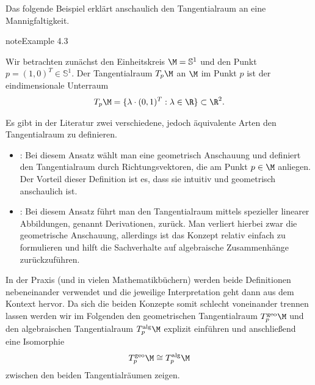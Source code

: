 \documentclass[letterpaper,10pt,english]{jupyterBook}
\begin{document}
\sphinxAtStartPar
Das folgende Beispiel erklärt anschaulich den Tangentialraum an eine Mannigfaltigkeit.
\label{manifolds/tangential:example-0}
\begin{sphinxadmonition}{note}{Example 4.3}



\sphinxAtStartPar
Wir betrachten zunächst den Einheitskreis \(\M = \mathbb{S}^1\) und den Punkt \(p = (1, 0)^T \in \mathbb{S}^1\).
Der Tangentialraum \(T_p\M\) an \(\M\) im Punkt \(p\) ist der eindimensionale Unterraum
\begin{equation*}
\begin{split}T_p\M = \lbrace \lambda \cdot (0, 1)^T : \lambda \in \R \rbrace \subset \R^2.\end{split}
\end{equation*}\end{sphinxadmonition}

\sphinxAtStartPar
Es gibt in der Literatur zwei verschiedene, jedoch äquivalente Arten den Tangentialraum zu definieren.
\begin{itemize}
\item {} 
\sphinxAtStartPar
{}: Bei diesem Ansatz wählt man eine geometrisch Anschauung und definiert den Tangentialraum durch Richtungsvektoren, die am Punkt \(p\in\M\) anliegen.
Der Vorteil dieser Definition ist es, dass sie intuitiv und geometrisch anschaulich ist.

\item {} 
\sphinxAtStartPar
{}: Bei diesem Ansatz führt man den Tangentialraum mittels spezieller linearer Abbildungen, genannt Derivationen, zurück.
Man verliert hierbei zwar die geometrische Anschauung, allerdings ist das Konzept relativ einfach zu formulieren und hilft die Sachverhalte auf algebraische Zusammenhänge zurückzuführen.

\end{itemize}

\sphinxAtStartPar
In der Praxis (und in vielen Mathematikbüchern) werden beide Definitionen nebeneinander verwendet und die jeweilige Interpretation geht dann aus dem Kontext hervor.
Da sich die beiden Konzepte somit schlecht voneinander trennen lassen werden wir im Folgenden den geometrischen Tangentialraum \(T^{\text{geo}}_p\M\) und den algebraischen Tangentialraum \(T^{\text{alg}}_p\M\) explizit einführen und anschließend eine Isomorphie
\begin{equation*}
\begin{split}T^{\text{geo}}_p\M\cong T^{\text{alg}}_p\M\end{split}
\end{equation*}
\sphinxAtStartPar
zwischen den beiden Tangentialräumen zeigen.
\end{document}

